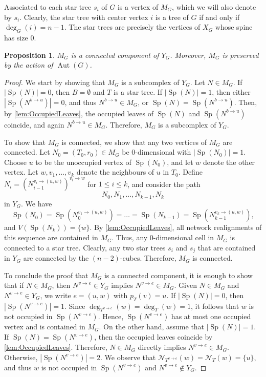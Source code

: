 \documentclass[reqno,dvipsnames]{amsart}
\theoremstyle{plain}
\newtheorem{proposition}[theorem]{Proposition}
\numberwithin{equation}{section}
\theoremstyle{definition}
\DeclareMathOperator{\degree}{deg}
\DeclareMathOperator{\Sp}{Sp}
\DeclareMathOperator{\Aut}{Aut}
\begin{document}
Associated to each star tree $s_i$ of $G$ is a vertex of $M_G$, which we will also denote by $s_i$. Clearly, the star tree with center vertex $i$ is a tree of $G$ if and only if $\deg_G(i) = n-1$. The star trees are precisely the vertices of $X_G$ whose spine has size $0$.

\begin{proposition}\label{prop:MainComponent}
	$M_G$ is a connected component of $Y_G$. Moreover, $M_G$ is preserved by the action of $\Aut(G)$.
\end{proposition}

\begin{proof}
	We start by showing that $M_G$ is a subcomplex of $Y_G$. Let $N\in M_G$. If $|\Sp(N)| = 0$, then $B = \emptyset$ and $T$ is a star tree. If $|\Sp(N)| = 1$, then either $|\Sp(N^{b\to u})| = 0$, and thus $N^{b\to u}\in M_G$, or $\Sp(N) = \Sp(N^{b\to u})$. Then, by \autoref{lem:OccupiedLeaves}, the occupied leaves of $\Sp(N)$ and $\Sp(N^{b\to u})$ coincide, and again $N^{b\to u}\in M_G$. Therefore, $M_G$ is a subcomplex of $Y_G$.
	
	To show that $M_G$ is connected, we show that any two vertices of $M_G$ are connected. Let $N_0 =(T_0, r_0)\in M_G$ be 0-dimensional with $|\Sp(N_0)| = 1$. Choose $u$ to be the unoccupied vertex of $\Sp(N_0)$, and let $w$ denote the other vertex. Let $w,v_1,\ldots,v_k$ denote the neighbours of $u$ in $T_0$. Define $N_i = (N_{i-1}^{v_i\to (u,w)})^{v_i\to w}$ for $1\leq i\leq k$, and consider the path
	\[
	N_0, N_1, \ldots, N_{k-1}, N_k
	\]
	in $Y_G$. We have 
	\[
	\Sp(N_0) = \Sp(N_0^{v_1\to (u,w)}) = \ldots = \Sp(N_{k-1}) = \Sp(N_{k-1}^{v_k\to (u,w)}),
	\]
	and $V(\Sp(N_k)) = \{w\}$. By \autoref{lem:OccupiedLeaves}, all network realignments of this sequence are contained in $M_G$. Thus, any 0-dimensional cell in $M_G$ is connected to a star tree. Clearly, any two star trees $s_i$ and $s_j$ that are contained in $Y_G$ are connected by the $(n-2)$-cubes. Therefore, $M_G$ is connected.
	
	To conclude the proof that $M_G$ is a connected component, it is enough to show that if $N\in M_G$, then $N^{v\to e}\in Y_G$ implies $N^{v\to e}\in M_G$. Given $N\in M_G$ and $N^{v\to e}\in Y_G$, we write $e = (u,w)$ with $p_T(v) = u$. If $|\Sp(N)| = 0$, then $|\Sp(N^{v\to e})| = 1$. Since $\degree_{T^{v\to e}} (w) = \degree_T(w) = 1$, it follows that $w$ is not occupied in $\Sp(N^{v\to e})$. Hence, $\Sp(N^{v\to e})$ has at most one occupied vertex and is contained in $M_G$. On the other hand, assume that $|\Sp(N)| = 1$. If $\Sp(N) = \Sp(N^{v\to e})$, then the occupied leaves coincide by \autoref{lem:OccupiedLeaves}. Therefore, $N\in M_G$ directly implies $N^{v\to e}\in M_G$. Otherwise, $|\Sp(N^{v\to e})| = 2$. We observe that $\mathcal{N}_{T^{v\to e}} (w) = \mathcal{N}_T(w) = \{u\}$, and thus $w$ is not occupied in $\Sp(N^{v\to e})$ and $N^{v\to e} \notin Y_G$.
	

\end{proof}
\end{document}
